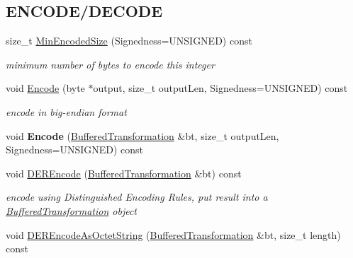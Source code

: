 \subsection*{ENCODE/DECODE}
\label{_amgrp504bf883702193e006878608276a59c5}
 \begin{DoxyCompactItemize}
\item 
size\_\-t \hyperlink{class_integer_a3b269bbf8a91faf217c0dd76222182bb}{MinEncodedSize} (Signedness=UNSIGNED) const 
\begin{DoxyCompactList}\small\item\em minimum number of bytes to encode this integer \item\end{DoxyCompactList}\item 
void \hyperlink{class_integer_ac12ea467de9a609b86ec03d8cb8837e4}{Encode} (byte $\ast$output, size\_\-t outputLen, Signedness=UNSIGNED) const 
\begin{DoxyCompactList}\small\item\em encode in big-\/endian format \item\end{DoxyCompactList}\item 
\hypertarget{class_integer_a18a664f00df5dcfb979b2e804e7418ce}{
void {\bfseries Encode} (\hyperlink{class_buffered_transformation}{BufferedTransformation} \&bt, size\_\-t outputLen, Signedness=UNSIGNED) const }
\label{class_integer_a18a664f00df5dcfb979b2e804e7418ce}

\item 
\hypertarget{class_integer_a6ab51a05bee88cfa690179611e8a084e}{
void \hyperlink{class_integer_a6ab51a05bee88cfa690179611e8a084e}{DEREncode} (\hyperlink{class_buffered_transformation}{BufferedTransformation} \&bt) const }
\label{class_integer_a6ab51a05bee88cfa690179611e8a084e}

\begin{DoxyCompactList}\small\item\em encode using Distinguished Encoding Rules, put result into a \hyperlink{class_buffered_transformation}{BufferedTransformation} object \item\end{DoxyCompactList}\item 
\hypertarget{class_integer_a1dc54b479df856d614cb23e362126110}{
void \hyperlink{class_integer_a1dc54b479df856d614cb23e362126110}{DEREncodeAsOctetString} (\hyperlink{class_buffered_transformation}{BufferedTransformation} \&bt, size\_\-t length) const }
\label{class_integer_a1dc54b479df856d614cb23e362126110}


\end{DoxyCompactItemize}
